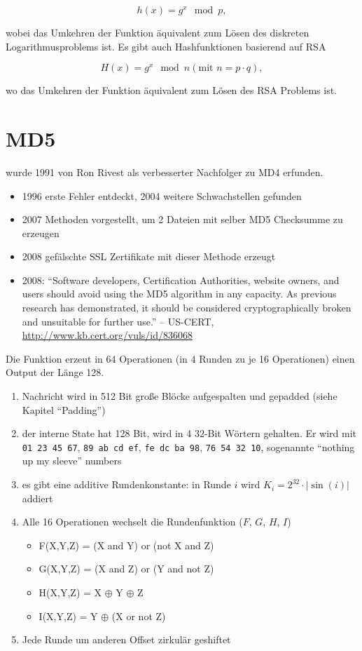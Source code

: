 $$h(x) = g^x \mod p,$$

wobei das Umkehren der Funktion äquivalent zum Lösen des diskreten Logarithmusproblems ist.
Es gibt auch Hashfunktionen basierend auf RSA

$$H(x) = g^x \mod n (\text{mit } n = p\cdot q),$$

wo das Umkehren der Funktion äquivalent zum Lösen des RSA Problems ist.

\section{MD5} wurde 1991 von Ron Rivest als verbesserter Nachfolger zu MD4 erfunden.

\begin{itemize}
    \item 1996 erste Fehler entdeckt, 2004 weitere Schwachstellen gefunden
    \item 2007 Methoden vorgestellt, um 2 Dateien mit selber MD5 Checksumme zu erzeugen
    \item 2008 gefälschte SSL Zertifikate mit dieser Methode erzeugt
    \item 2008: ``Software developers, Certification Authorities, website owners, and users should avoid using the MD5 algorithm in any capacity. As previous research 
    has demonstrated, it should be considered cryptographically broken and unsuitable for further use.'' -- US-CERT, \url{http://www.kb.cert.org/vuls/id/836068}
\end{itemize}

Die Funktion erzeut in 64 Operationen (in 4 Runden zu je 16 Operationen) einen Output der Länge 128.

\begin{enumerate}
    \item Nachricht wird in 512 Bit große Blöcke aufgespalten und gepadded (siehe Kapitel ``Padding'')
    \item der interne State hat 128 Bit, wird in 4 32-Bit Wörtern gehalten. Er wird mit \verb|01 23 45 67|, \verb|89 ab cd ef|, \verb|fe dc ba 98|, \verb|76 54 32 10|, 
    sogenannte ``nothing up my sleeve'' numbers
    \item es gibt eine additive Rundenkonstante: in Runde $i$ wird $K_i = 2^{32}\cdot|\sin(i)|$ addiert 
    \item Alle 16 Operationen wechselt die Rundenfunktion ($F$, $G$, $H$, $I$)
    \begin{itemize}
        \item F(X,Y,Z) = (X and Y) or (not X and Z)
        \item G(X,Y,Z) = (X and Z) or (Y and not Z)
        \item H(X,Y,Z) = X $\oplus$ Y $\oplus$ Z
        \item I(X,Y,Z) = Y $\oplus$ (X or not Z)
    \end{itemize}
    \item Jede Runde um anderen Offset zirkulär geshiftet
\end{enumerate}

